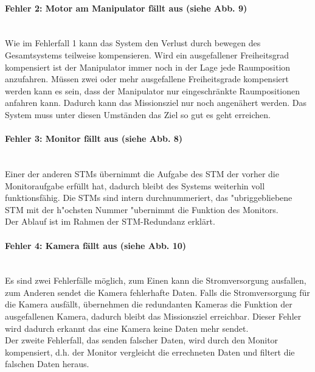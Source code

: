 \paragraph{\textbf{Fehler 2: Motor am Manipulator fällt aus (siehe Abb. 9)}}$\;$\\ 
Wie im Fehlerfall 1 kann das System den Verlust durch bewegen des Gesamtsystems teilweise kompensieren.
Wird ein ausgefallener Freiheitsgrad kompensiert ist der Manipulator immer noch in der Lage jede Raumposition anzufahren. Müssen zwei oder mehr ausgefallene Freiheitsgrade kompensiert werden kann es sein, dass der Manipulator nur eingeschränkte Raumpositionen anfahren kann. Dadurch kann das Missionsziel nur noch angenähert werden. Das System muss unter diesen Umständen das Ziel so gut es geht erreichen.

\paragraph{\textbf{Fehler 3: Monitor fällt aus (siehe Abb. 8)}}$\;$\\
Einer der anderen STMs übernimmt die Aufgabe des STM der vorher die Monitoraufgabe erfüllt hat, dadurch bleibt des Systems weiterhin voll funktionsfähig.
Die STMs sind intern durchnummeriert, das "ubriggebliebene STM mit der h"ochsten Nummer "ubernimmt die Funktion des Monitors.\\
Der Ablauf ist im Rahmen der STM-Redundanz erklärt.

\paragraph{\textbf{Fehler 4: Kamera fällt aus (siehe Abb. 10)}}$\;$\\
Es sind zwei Fehlerfälle möglich, zum Einen kann die Stromversorgung ausfallen, zum Anderen sendet die Kamera fehlerhafte Daten.
Falls die Stromversorgung für die Kamera ausfällt, übernehmen die redundanten Kameras die Funktion der ausgefallenen Kamera, dadurch bleibt das Missionsziel erreichbar.
Dieser Fehler wird dadurch erkannt das eine Kamera keine Daten mehr sendet.\\
Der zweite Fehlerfall, das senden falscher Daten, wird durch den Monitor kompensiert, d.h. der Monitor vergleicht die errechneten Daten und filtert die falschen Daten heraus.

